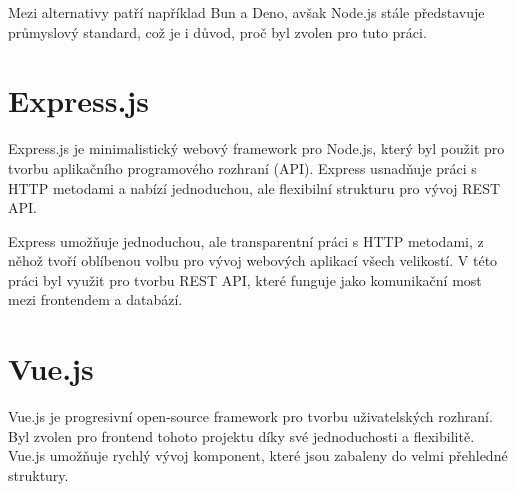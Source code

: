 Mezi alternativy patří například Bun a Deno, avšak Node.js stále představuje průmyslový standard, což je i důvod, proč byl zvolen pro tuto práci\cite{chhetri2016comparative}.

\section{Express.js}
Express.js je minimalistický webový framework pro Node.js, který byl použit pro tvorbu aplikačního programového rozhraní (API). Express usnadňuje práci s HTTP metodami a nabízí jednoduchou, ale flexibilní strukturu pro vývoj REST API\cite{expressjsExpressNodejs}.

Express umožňuje jednoduchou, ale transparentní práci s HTTP metodami, z něhož tvoří oblíbenou volbu pro vývoj webových aplikací všech velikostí. V této práci byl využit pro tvorbu REST API, které funguje jako komunikační most mezi frontendem a databází.

\section{Vue.js}
Vue.js je progresivní open-source framework pro tvorbu uživatelských rozhraní\cite{vuejsVuejs}. Byl zvolen pro frontend tohoto projektu díky své jednoduchosti a flexibilitě. Vue.js umožňuje rychlý vývoj komponent, které jsou zabaleny do velmi přehledné struktury.

